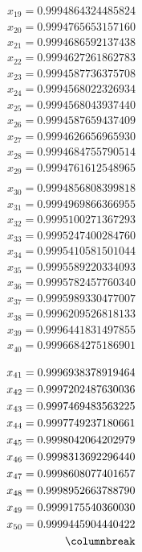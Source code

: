 \begin{multicols}{3}
	\begin{align*}
		x_{19} = 0.9994864324485824\\
		x_{20} = 0.9994765653157160\\
		x_{21} = 0.9994686592137438\\
		x_{22} = 0.9994627261862783\\
		x_{23} = 0.9994587736375708\\
		x_{24} = 0.9994568022326934\\
		x_{25} = 0.9994568043937440\\
		x_{26} = 0.9994587659437409\\
		x_{27} = 0.9994626656965930\\
		x_{28} = 0.9994684755790514\\
		x_{29} = 0.9994761612548965\\
	\end{align*}
	\columnbreak
	\vfill
	\begin{align*}
		x_{30} = 0.9994856808399818\\
		x_{31} = 0.9994969866366955\\
		x_{32} = 0.9995100271367293\\
		x_{33} = 0.9995247400284760\\
		x_{34} = 0.9995410581501044\\
		x_{35} = 0.9995589220334093\\
		x_{36} = 0.9995782457760340\\
		x_{37} = 0.9995989330477007\\
		x_{38} = 0.9996209526818133\\
		x_{39} = 0.9996441831497855\\
		x_{40} = 0.9996684275186901\\
	\end{align*}
	\columnbreak
	\vfill
	\begin{align*}
		x_{41} = 0.9996938378919464\\
		x_{42} = 0.9997202487630036\\
		x_{43} = 0.9997469483563225\\
		x_{44} = 0.9997749237180661\\
		x_{45} = 0.9998042064202979\\
		x_{46} = 0.9998313692296440\\
		x_{47} = 0.9998608077401657\\
		x_{48} = 0.9998952663788790\\
		x_{49} = 0.9999175540360030\\
		x_{50} = 0.9999445904440422\\
		\columnbreak
	\end{align*}
\end{multicols}
